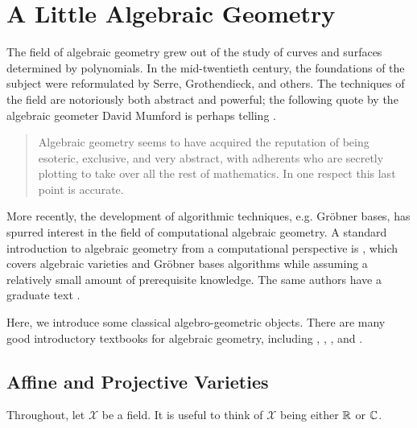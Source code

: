 \documentclass[cclicense]{hmcthesis}
\newcommand*{\F}{\mathcal{X}}
\numberwithin{equation}{section}
\begin{document}


\appendix

\chapter{A Little Algebraic Geometry}

    The field of algebraic geometry grew out of the study of curves and surfaces
    determined by polynomials.  In the mid-twentieth century, the foundations of
    the subject were reformulated by Serre, Grothendieck, and others.  The
    techniques of the field are notoriously both abstract and powerful; the
    following quote by the algebraic geometer David Mumford is perhaps telling
    \citep{Mum99}.
    \begin{quote}
        Algebraic geometry seems to have acquired the reputation of being
        esoteric, exclusive, and very abstract, with adherents who are secretly
        plotting to take over all the rest of mathematics.  In one respect this
        last point is accurate.
    \end{quote}
    More recently, the development of algorithmic techniques, e.g. Gröbner
    bases, has spurred interest in the field of computational algebraic
    geometry.  A standard introduction to algebraic geometry from a
    computational perspective is \citep{CLO97}, which covers algebraic varieties
    and Gröbner bases algorithms while assuming a relatively small amount of
    prerequisite knowledge.  The same authors have a graduate text \citep{CLO05}.

    Here, we introduce some classical algebro-geometric objects.  There are
    many good introductory textbooks for algebraic geometry, including
    \citep{Invitation}, \citep{Sha94}, \citep{Hart}, and \citep{Mum99}.

\section{Affine and Projective Varieties}
    \label{sec:varieties}
    Throughout, let $\F$ be a field.  It is useful to think of $\F$ being either
    $\mathbb{R}$ or $\mathbb{C}$.
\end{document}
